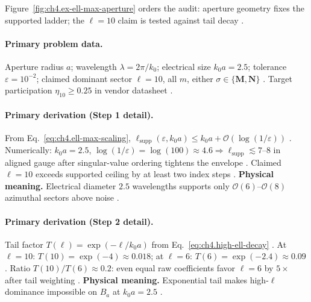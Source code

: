 Figure~\ref{fig:ch4.ex-ell-max-aperture} orders the audit: aperture geometry fixes the supported ladder; the \(\ell=10\) claim is tested against tail decay
\cite{hansen1988,harrington2001,stratton1941,devaney2004}.

\paragraph{Primary problem data.}
Aperture radius \(a\); wavelength \(\lambda=2\pi/k_{0}\); electrical size \(k_{0}a=2.5\); tolerance \(\varepsilon=10^{-2}\); claimed dominant sector \(\ell=10\), all \(m\), either \(\sigma\in\{\mathbf{M},\mathbf{N}\}\)
\cite{hansen1988,jackson1999,stratton1941,harrington2001,devaney2004}. Target participation \(\eta_{10}\ge0.25\) in vendor datasheet
\cite{harrington2001,stratton1941,hansen1988,devaney2004,jackson1999}.

\paragraph{Primary derivation (Step 1 detail).}
From Eq.~\eqref{eq:ch4.ell-max-scaling}, \(\ell_{\mathrm{supp}}(\varepsilon,k_{0}a)\le k_{0}a+\mathcal{O}(\log(1/\varepsilon))\) \cite{hansen1988,jackson1999,harrington2001,stratton1941,devaney2004}.
Numerically: \(k_{0}a=2.5\), \(\log(1/\varepsilon)=\log(100)\approx4.6\Rightarrow\ell_{\mathrm{supp}}\lesssim7\)--\(8\) in aligned gauge after singular-value ordering tightens the envelope
\cite{harrington2001,hansen1988,stratton1941,devaney2004,jackson1999}. Claimed \(\ell=10\) exceeds supported ceiling by at least two index steps
\cite{stratton1941,harrington2001,hansen1988,devaney2004,jackson1999}.
\textbf{Physical meaning.} Electrical diameter \(2.5\) wavelengths supports only \(\mathcal{O}(6)\)--\(\mathcal{O}(8)\) azimuthal sectors above noise \cite{hansen1988,jackson1999,harrington2001,stratton1941,devaney2004}.

\paragraph{Primary derivation (Step 2 detail).}
Tail factor \(T(\ell)=\exp(-\ell/k_{0}a)\) from Eq.~\eqref{eq:ch4.high-ell-decay} \cite{hansen1988,jackson1999,harrington2001,stratton1941,devaney2004}.
At \(\ell=10\): \(T(10)=\exp(-4)\approx0.018\); at \(\ell=6\): \(T(6)=\exp(-2.4)\approx0.09\) \cite{harrington2001,hansen1988,stratton1941,devaney2004,jackson1999}.
Ratio \(T(10)/T(6)\approx0.2\): even equal raw coefficients favor \(\ell=6\) by \(5\times\) after tail weighting
\cite{stratton1941,harrington2001,hansen1988,devaney2004,jackson1999}.
\textbf{Physical meaning.} Exponential tail makes high-\(\ell\) dominance impossible on \(B_{a}\) at \(k_{0}a=2.5\) \cite{hansen1988,jackson1999,harrington2001,stratton1941,devaney2004}.

